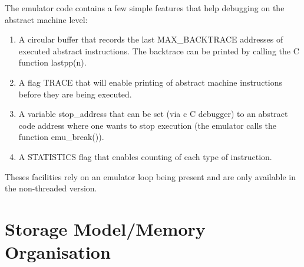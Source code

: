 The emulator code contains a few simple features that help debugging
on the abstract machine level:
\begin{enumerate}
\item A circular buffer that records
the last MAX_BACKTRACE addresses of executed abstract instructions.
The backtrace can be printed by calling the C function lastpp(n).
\item A flag TRACE that will enable printing of abstract machine
instructions before they are being executed.
\item A variable stop_address that can be set (via c C debugger)
to an abstract code address where one wants to stop execution
(the emulator calls the function emu_break()).
\item A STATISTICS flag that enables counting of each
type of instruction.
\end{enumerate}
Theses facilities rely on an emulator loop being present and
are only available in the non-threaded version.


\section{Storage Model/Memory Organisation}

